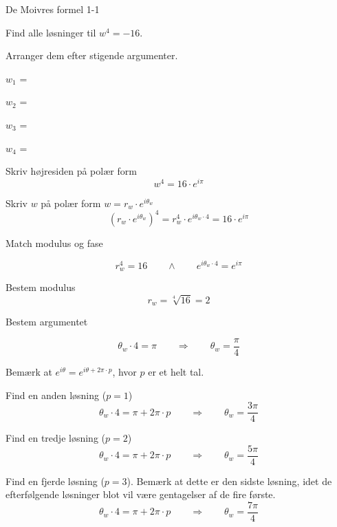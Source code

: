 \documentclass{article}
\begin{document}
\tableofcontents
\newpage

\begin{exercise}{De Moivres formel 1-1}

Find alle løsninger til $w^4=-16$. 

Arranger dem efter stigende argumenter.

$w_1$ = 		

$w_2$ = 		

$w_3$ = 		

$w_4$ = 


\hint 

Skriv højresiden på polær form
\[
w^4 = 16 \cdot e^{i \pi}
\]


\hint

Skriv $w$ på polær form $w = r_w \cdot e^{i \theta_w}$
\[
\left(r_w \cdot e^{i \theta_w}\right)^4 = r_w^4 \cdot e^{i \theta_w \cdot 4} = 16 \cdot e^{i \pi}
\]

\hint 
Match modulus og fase

\[
r_w^4 = 16 \qquad \wedge \qquad e^{i \theta_w \cdot 4} = e^{i \pi}
\]

\hint

Bestem modulus
\[
r_w  =  \sqrt[4]{16} = 2
\]

\hint

Bestem argumentet

\[
\theta_w \cdot 4 = \pi \qquad \Rightarrow \qquad  \theta_w = \frac{\pi}{4}
\]

\hint

Bemærk at $e^{i \theta} = e^{i \theta + 2 \pi \cdot p}$, hvor $p$ er et helt tal.

\hint

Find en anden løsning ($p=1$)
\[
\theta_w \cdot 4 = \pi  + 2 \pi \cdot p \qquad \Rightarrow \qquad  \theta_w = \frac{3 \pi}{4}
\]

\hint

Find en tredje løsning ($p=2$)
\[
\theta_w \cdot 4 = \pi  + 2 \pi \cdot p \qquad \Rightarrow  \qquad  \theta_w = \frac{5 \pi}{4}
\]

\hint

Find en fjerde løsning ($p=3$). 
Bemærk at dette er den sidste løsning, idet de efterfølgende 
løsninger blot vil være gentagelser af de fire første. 
\[
\theta_w \cdot 4 = \pi  + 2 \pi \cdot p \qquad \Rightarrow  \qquad  \theta_w = \frac{7 \pi}{4}
\]

\end{exercise}
\end{document}
